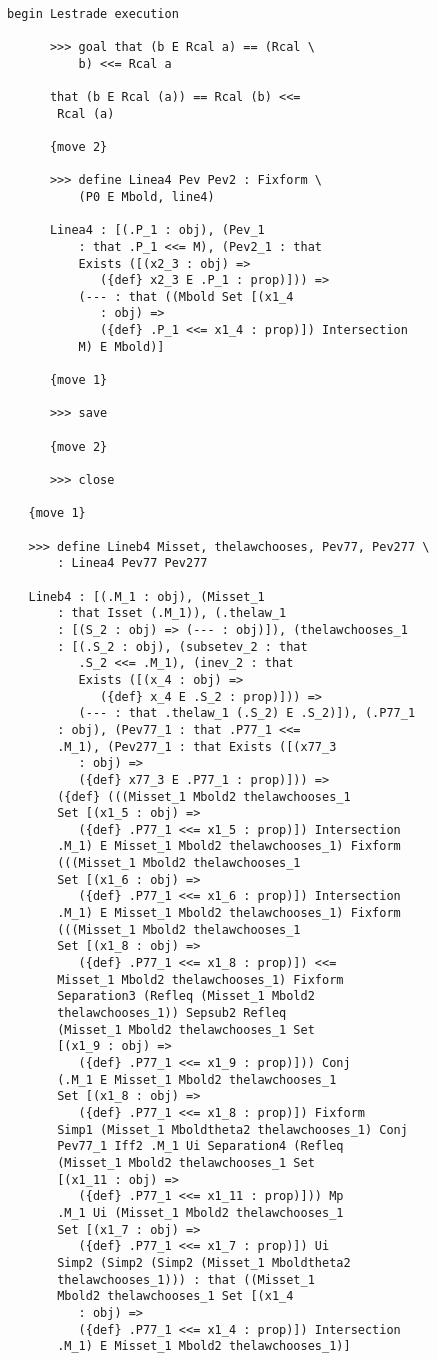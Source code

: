 \documentclass[12pt]{article}
\begin{document}
\begin{verbatim}

begin Lestrade execution

      >>> goal that (b E Rcal a) == (Rcal \
          b) <<= Rcal a

      that (b E Rcal (a)) == Rcal (b) <<= 
       Rcal (a)

      {move 2}

      >>> define Linea4 Pev Pev2 : Fixform \
          (P0 E Mbold, line4)

      Linea4 : [(.P_1 : obj), (Pev_1 
          : that .P_1 <<= M), (Pev2_1 : that 
          Exists ([(x2_3 : obj) => 
             ({def} x2_3 E .P_1 : prop)])) => 
          (--- : that ((Mbold Set [(x1_4 
             : obj) => 
             ({def} .P_1 <<= x1_4 : prop)]) Intersection 
          M) E Mbold)]

      {move 1}

      >>> save

      {move 2}

      >>> close

   {move 1}

   >>> define Lineb4 Misset, thelawchooses, Pev77, Pev277 \
       : Linea4 Pev77 Pev277

   Lineb4 : [(.M_1 : obj), (Misset_1 
       : that Isset (.M_1)), (.thelaw_1 
       : [(S_2 : obj) => (--- : obj)]), (thelawchooses_1 
       : [(.S_2 : obj), (subsetev_2 : that 
          .S_2 <<= .M_1), (inev_2 : that 
          Exists ([(x_4 : obj) => 
             ({def} x_4 E .S_2 : prop)])) => 
          (--- : that .thelaw_1 (.S_2) E .S_2)]), (.P77_1 
       : obj), (Pev77_1 : that .P77_1 <<= 
       .M_1), (Pev277_1 : that Exists ([(x77_3 
          : obj) => 
          ({def} x77_3 E .P77_1 : prop)])) => 
       ({def} (((Misset_1 Mbold2 thelawchooses_1 
       Set [(x1_5 : obj) => 
          ({def} .P77_1 <<= x1_5 : prop)]) Intersection 
       .M_1) E Misset_1 Mbold2 thelawchooses_1) Fixform 
       (((Misset_1 Mbold2 thelawchooses_1 
       Set [(x1_6 : obj) => 
          ({def} .P77_1 <<= x1_6 : prop)]) Intersection 
       .M_1) E Misset_1 Mbold2 thelawchooses_1) Fixform 
       (((Misset_1 Mbold2 thelawchooses_1 
       Set [(x1_8 : obj) => 
          ({def} .P77_1 <<= x1_8 : prop)]) <<= 
       Misset_1 Mbold2 thelawchooses_1) Fixform 
       Separation3 (Refleq (Misset_1 Mbold2 
       thelawchooses_1)) Sepsub2 Refleq 
       (Misset_1 Mbold2 thelawchooses_1 Set 
       [(x1_9 : obj) => 
          ({def} .P77_1 <<= x1_9 : prop)])) Conj 
       (.M_1 E Misset_1 Mbold2 thelawchooses_1 
       Set [(x1_8 : obj) => 
          ({def} .P77_1 <<= x1_8 : prop)]) Fixform 
       Simp1 (Misset_1 Mboldtheta2 thelawchooses_1) Conj 
       Pev77_1 Iff2 .M_1 Ui Separation4 (Refleq 
       (Misset_1 Mbold2 thelawchooses_1 Set 
       [(x1_11 : obj) => 
          ({def} .P77_1 <<= x1_11 : prop)])) Mp 
       .M_1 Ui (Misset_1 Mbold2 thelawchooses_1 
       Set [(x1_7 : obj) => 
          ({def} .P77_1 <<= x1_7 : prop)]) Ui 
       Simp2 (Simp2 (Simp2 (Misset_1 Mboldtheta2 
       thelawchooses_1))) : that ((Misset_1 
       Mbold2 thelawchooses_1 Set [(x1_4 
          : obj) => 
          ({def} .P77_1 <<= x1_4 : prop)]) Intersection 
       .M_1) E Misset_1 Mbold2 thelawchooses_1)]


\end{verbatim}
\end{document}
